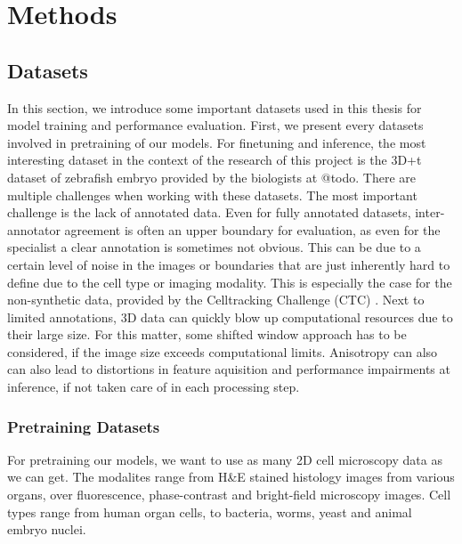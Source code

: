 \chapter{Methods}

\section{Datasets}
In this section, we introduce some important datasets used in this thesis for model training and performance evaluation. First, we present every datasets involved in pretraining of our models. For finetuning and inference, the most interesting dataset in the context of the research of this project is the 3D+t dataset of zebrafish embryo provided by the biologists at @todo.
There are multiple challenges when working with these datasets. The most important challenge is the lack of annotated data. Even for fully annotated datasets, inter-annotator agreement is often an upper boundary for evaluation, as even for the specialist a clear annotation is sometimes not obvious. This can be due to a certain level of noise in the images or boundaries that are just inherently hard to define due to the cell type or imaging modality. This is especially the case for the non-synthetic data, provided by the Celltracking Challenge (CTC) \cite{ctc}. Next to limited annotations, 3D data can quickly blow up computational resources due to their large size. For this matter, some shifted window approach has to be considered, if the image size exceeds computational limits. Anisotropy can also can also lead to distortions in feature aquisition and performance impairments at inference, if not taken care of in each processing step. 

\subsection{Pretraining Datasets}
For pretraining our models, we want to use as many 2D cell microscopy data as we can get. The modalites range from H\&E stained histology images from various organs, over fluorescence, phase-contrast and bright-field microscopy images. Cell types range from human organ cells, to bacteria, worms, yeast and animal embryo nuclei.

